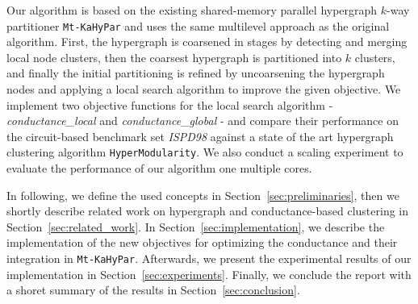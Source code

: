 \documentclass[acmsmall,nonacm,screen,review]{acmart}
\begin{document}
\noindent Our algorithm is based on the existing shared-memory parallel 
hypergraph $k$-way partitioner \texttt{Mt-KaHyPar} and uses the same 
multilevel approach as the original algorithm. First, the hypergraph is 
coarsened in stages by detecting and merging local node clusters, then 
the coarsest hypergraph is partitioned into $k$ clusters, and finally 
the initial partitioning is refined by uncoarsening the hypergraph 
nodes and applying a local search algorithm to improve the given 
objective. We implement two objective functions for the local search 
algorithm - \textit{conductance\_local} and 
\textit{conductance\_global} - and compare their performance on the
circuit-based benchmark set \textit{ISPD98} \cite{IBMBenchmark} against 
a state of the art hypergraph clustering algorithm 
\texttt{HyperModularity}. We also conduct a scaling experiment to 
evaluate the performance of our algorithm one multiple cores.

\noindent In following, we define the used concepts in 
Section~\ref{sec:preliminaries}, then we shortly describe related work 
on hypergraph and conductance-based clustering in 
Section~\ref{sec:related_work}. In Section~\ref{sec:implementation}, 
we describe the implementation of the new objectives for optimizing 
the conductance and their integration in \texttt{Mt-KaHyPar}. 
Afterwards, we present the experimental results of our implementation 
in Section~\ref{sec:experiments}. Finally, we conclude the report 
with a shoret summary of the results in Section~\ref{sec:conclusion}.


\end{document}
